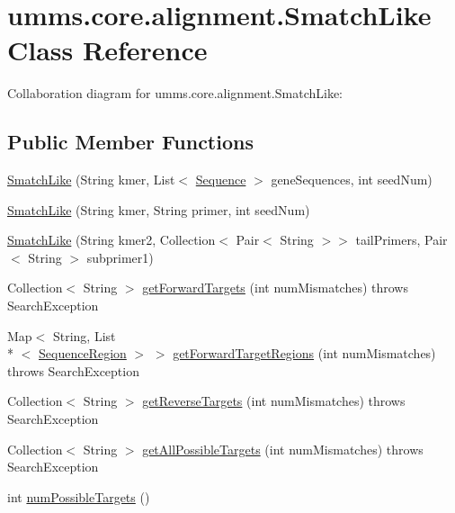 \hypertarget{classumms_1_1core_1_1alignment_1_1_smatch_like}{\section{umms.\+core.\+alignment.\+Smatch\+Like Class Reference}
\label{classumms_1_1core_1_1alignment_1_1_smatch_like}
}


Collaboration diagram for umms.\+core.\+alignment.\+Smatch\+Like\+:
\subsection*{Public Member Functions}
\begin{DoxyCompactItemize}
\item 
\hyperlink{classumms_1_1core_1_1alignment_1_1_smatch_like_ae70e0db3185d199299525bf6a1593135}{Smatch\+Like} (String kmer, List$<$ \hyperlink{classbroad_1_1core_1_1sequence_1_1_sequence}{Sequence} $>$ gene\+Sequences, int seed\+Num)
\item 
\hyperlink{classumms_1_1core_1_1alignment_1_1_smatch_like_a9d7334ec3da8075166fb17ae52ff854e}{Smatch\+Like} (String kmer, String primer, int seed\+Num)
\item 
\hyperlink{classumms_1_1core_1_1alignment_1_1_smatch_like_aedf471862114aefaaa236bda01eaaa6a}{Smatch\+Like} (String kmer2, Collection$<$ Pair$<$ String $>$$>$ tail\+Primers, Pair$<$ String $>$ subprimer1)
\item 
Collection$<$ String $>$ \hyperlink{classumms_1_1core_1_1alignment_1_1_smatch_like_a637526895697dd36d8bd7acc33be1b05}{get\+Forward\+Targets} (int num\+Mismatches)  throws Search\+Exception
\item 
Map$<$ String, List\\*
$<$ \hyperlink{classbroad_1_1core_1_1sequence_1_1_sequence_region}{Sequence\+Region} $>$ $>$ \hyperlink{classumms_1_1core_1_1alignment_1_1_smatch_like_afd7abcc767e14a7bef6d6a7bfe26002f}{get\+Forward\+Target\+Regions} (int num\+Mismatches)  throws Search\+Exception
\item 
Collection$<$ String $>$ \hyperlink{classumms_1_1core_1_1alignment_1_1_smatch_like_ae07909228a8cc278e182d7f148d269c1}{get\+Reverse\+Targets} (int num\+Mismatches)  throws Search\+Exception
\item 
Collection$<$ String $>$ \hyperlink{classumms_1_1core_1_1alignment_1_1_smatch_like_aa1900953c5ea1d5ab406fa083557e752}{get\+All\+Possible\+Targets} (int num\+Mismatches)  throws Search\+Exception
\item 
int \hyperlink{classumms_1_1core_1_1alignment_1_1_smatch_like_a415dcff2420c6e12a94af642d6d1d376}{num\+Possible\+Targets} ()
\end{DoxyCompactItemize}
